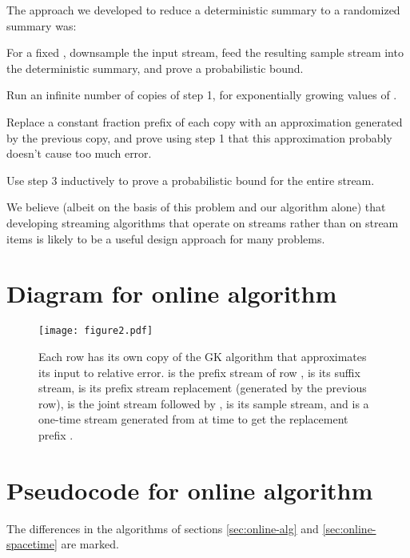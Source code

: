 \documentclass{article}
\theoremstyle{plain}
\begin{document}
The approach we developed to reduce a deterministic summary to a randomized
summary was:
\begin{enumerate*}
\item For a fixed , downsample the input stream, feed the resulting sample
  stream into the deterministic summary, and prove a probabilistic bound.
\item Run an infinite number of copies of step 1, for exponentially growing
  values of .
\item Replace a constant fraction prefix of each copy with an approximation
  generated by the previous copy, and prove using step 1 that this approximation
  probably doesn't cause too much error.
\item Use step 3 inductively to prove a probabilistic bound for the entire
  stream.
\end{enumerate*}
We believe (albeit on the basis of this problem and our algorithm alone) that
developing streaming algorithms that operate on streams rather than on stream
items is likely to be a useful design approach for many problems.
 


 

\appendix

\newpage
\section{Diagram for online algorithm}
\label{sec:appendix-online-alg-diagram}

\begin{figure}[H]
    \texttt{[image: figure2.pdf]}
    \centering
    \caption{Each row  has its own copy  of the GK algorithm that
      approximates its input to  relative error.  is the prefix
      stream of row ,  is its suffix stream,  is its prefix stream
      replacement (generated by the previous row),  is the joint stream
       followed by ,  is its sample stream, and  is a
      one-time stream generated from  at time  to get the
      replacement prefix .}
    \label{fig:figure2}
\end{figure}
 
\newpage
\section{Pseudocode for online algorithm}
\label{sec:appendix-online-alg-listing}

The differences in the algorithms of sections \ref{sec:online-alg} and
\ref{sec:online-spacetime} are marked.
\end{document}
